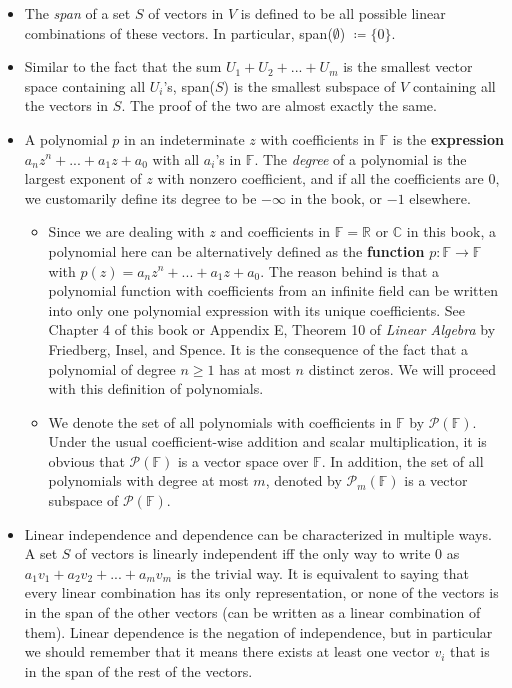 \documentclass{article}
\newcommand{\R}{\mathbb{R}}
\newcommand{\C}{\mathbb{C}}
\newcommand{\F}{\mathbb{F}}
\begin{document}
\begin{itemize}
    \item The \textit{span} of a set $S$ of vectors in $V$ is defined to be all possible linear combinations of these vectors. In particular, span($\emptyset$) $\coloneqq \{0\}$.
    \item Similar to the fact that the sum $U_1 + U_2 +...+ U_m$ is the smallest vector space containing all $U_i$'s, span($S$) is the smallest subspace of $V$ containing all the vectors in $S$. The proof of the two are almost exactly the same.
    \item A polynomial $p$ in an indeterminate $z$ with coefficients in $\F$ is the \textbf{expression} $a_n z^n + ... + a_1 z + a_0$ with all $a_i$'s in $\F$. The \textit{degree} of a polynomial is the largest exponent of $z$ with nonzero coefficient, and if all the coefficients are 0, we customarily define its degree to be $-\infty$ in the book, or $-1$ elsewhere.
    \begin{itemize}
        \item Since we are dealing with $z$ and coefficients in $\F = \R$ or $\C$ in this book, a polynomial here can be alternatively defined as the \textbf{function} $p: \F \rightarrow \F$ with $p(z) = a_n z^n + ... + a_1 z + a_0$. The reason behind is that a polynomial function with coefficients from an infinite field can be written into only one polynomial expression with its unique coefficients. See Chapter 4 of this book or Appendix E, Theorem 10 of \textit{Linear Algebra} by Friedberg, Insel, and Spence. It is the consequence of the fact that a polynomial of degree $n \geq 1$ has at most $n$ distinct zeros. We will proceed with this definition of polynomials.
        \item We denote the set of all polynomials with coefficients in $\F$ by $\mathcal{P}(\F)$. Under the usual coefficient-wise addition and scalar multiplication, it is obvious that $\mathcal{P}(\F)$ is a vector space over $\F$. In addition, the set of all polynomials with degree at most $m$, denoted by $\mathcal{P}_m(\F)$ is a vector subspace of $\mathcal{P}(\F)$.
    \end{itemize}
    \item Linear independence and dependence can be characterized in multiple ways. A set $S$ of vectors is linearly independent iff the only way to write 0 as $a_1v_1 + a_2v_2 + ... +a_mv_m$ is the trivial way. It is equivalent to saying that every linear combination has its only representation, or none of the vectors is in the span of the other vectors (can be written as a linear combination of them). Linear dependence is the negation of independence, but in particular we should remember that it means there exists at least one vector $v_i$ that is in the span of the rest of the vectors.

\end{itemize}
\end{document}
